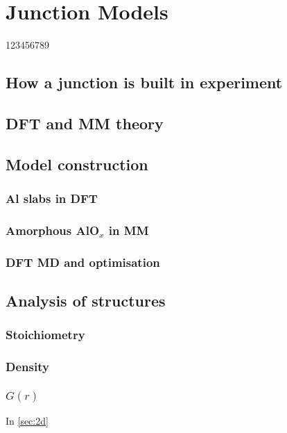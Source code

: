 \chapter{Junction Models}
    123456789
    \section{How a junction is built in experiment}
    \section{DFT and MM theory}
    \section{Model construction}
    \subsection{Al slabs in DFT}
    \subsection{Amorphous AlO$_{x}$ in MM}
    \subsection{DFT MD and optimisation}
    \section{Analysis of structures}
    \subsection{Stoichiometry}
    \subsection{Density}
    \subsection{$G(r)$}
    In \cref{sec:2d}